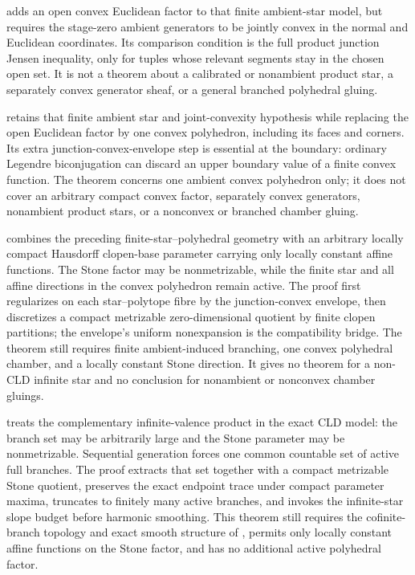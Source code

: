 \begin{remark}
 adds an open convex Euclidean
factor to that finite ambient-star model, but requires the stage-zero
ambient generators to be jointly convex in the normal and Euclidean
coordinates.  Its comparison condition is the full product junction Jensen
inequality, only for tuples whose relevant segments stay in the chosen open
set.  It is not a theorem about a calibrated or nonambient product star, a
separately convex generator sheaf, or a general branched polyhedral gluing.

 retains that finite ambient
star and joint-convexity hypothesis while replacing the open Euclidean factor
by one convex polyhedron, including its faces and corners.  Its extra
junction-convex-envelope step is essential at the boundary: ordinary
Legendre biconjugation can discard an upper boundary value of a finite convex
function.  The theorem concerns one ambient convex polyhedron only; it does
not cover an arbitrary compact convex factor, separately convex generators,
nonambient product stars, or a nonconvex or branched chamber gluing.

 combines the preceding
finite-star--polyhedral geometry with an arbitrary locally compact Hausdorff
clopen-base parameter carrying only locally constant affine functions.  The
Stone factor may be nonmetrizable, while the finite star and all affine
directions in the convex polyhedron remain active.  The proof first
regularizes on each star--polytope fibre by the junction-convex envelope,
then discretizes a compact metrizable zero-dimensional quotient by finite
clopen partitions; the envelope's uniform nonexpansion is the compatibility
bridge.  The theorem still requires finite ambient-induced branching, one
convex polyhedral chamber, and a locally constant Stone direction.  It gives
no theorem for a non-CLD infinite star and no conclusion for nonambient or
nonconvex chamber gluings.

 treats the complementary
infinite-valence product in the exact CLD model: the branch set may be
arbitrarily large and the Stone parameter may be nonmetrizable.  Sequential
generation forces one common countable set of active full branches.  The
proof extracts that set together with a compact metrizable Stone quotient,
preserves the exact endpoint trace under compact parameter maxima, truncates
to finitely many active branches, and invokes the infinite-star slope budget
before harmonic smoothing.  This theorem still requires the cofinite-branch
topology and exact smooth structure of \cite[\S6.7.3]{CLD25}, permits only
locally constant affine functions on the Stone factor, and has no additional
active polyhedral factor.


\end{remark}
